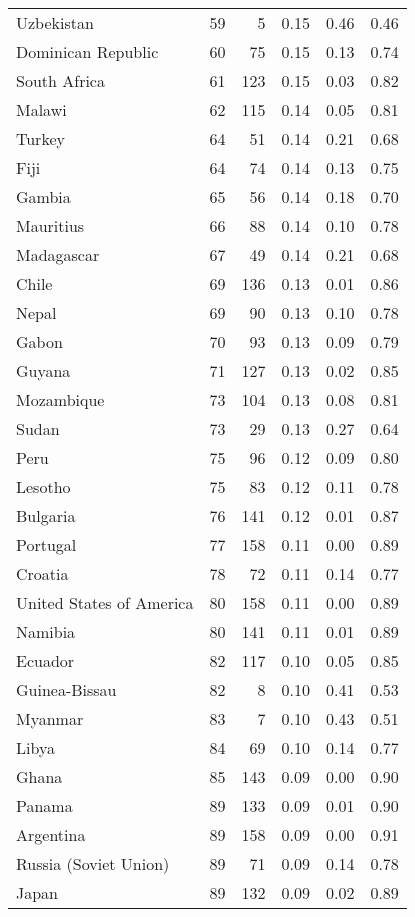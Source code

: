 \begin{longtable}[t]{lrrrrr}
Uzbekistan & 59 & 5 & 0.15 & 0.46 & 0.46\\
Dominican Republic & 60 & 75 & 0.15 & 0.13 & 0.74\\
\addlinespace
South Africa & 61 & 123 & 0.15 & 0.03 & 0.82\\
Malawi & 62 & 115 & 0.14 & 0.05 & 0.81\\
Turkey & 64 & 51 & 0.14 & 0.21 & 0.68\\
Fiji & 64 & 74 & 0.14 & 0.13 & 0.75\\
Gambia & 65 & 56 & 0.14 & 0.18 & 0.70\\
\addlinespace
Mauritius & 66 & 88 & 0.14 & 0.10 & 0.78\\
Madagascar & 67 & 49 & 0.14 & 0.21 & 0.68\\
Chile & 69 & 136 & 0.13 & 0.01 & 0.86\\
Nepal & 69 & 90 & 0.13 & 0.10 & 0.78\\
Gabon & 70 & 93 & 0.13 & 0.09 & 0.79\\
\addlinespace
Guyana & 71 & 127 & 0.13 & 0.02 & 0.85\\
Mozambique & 73 & 104 & 0.13 & 0.08 & 0.81\\
Sudan & 73 & 29 & 0.13 & 0.27 & 0.64\\
Peru & 75 & 96 & 0.12 & 0.09 & 0.80\\
Lesotho & 75 & 83 & 0.12 & 0.11 & 0.78\\
\addlinespace
Bulgaria & 76 & 141 & 0.12 & 0.01 & 0.87\\
Portugal & 77 & 158 & 0.11 & 0.00 & 0.89\\
Croatia & 78 & 72 & 0.11 & 0.14 & 0.77\\
United States of America & 80 & 158 & 0.11 & 0.00 & 0.89\\
Namibia & 80 & 141 & 0.11 & 0.01 & 0.89\\
\addlinespace
Ecuador & 82 & 117 & 0.10 & 0.05 & 0.85\\
Guinea-Bissau & 82 & 8 & 0.10 & 0.41 & 0.53\\
Myanmar & 83 & 7 & 0.10 & 0.43 & 0.51\\
Libya & 84 & 69 & 0.10 & 0.14 & 0.77\\
Ghana & 85 & 143 & 0.09 & 0.00 & 0.90\\
\addlinespace
Panama & 89 & 133 & 0.09 & 0.01 & 0.90\\
Argentina & 89 & 158 & 0.09 & 0.00 & 0.91\\
Russia (Soviet Union) & 89 & 71 & 0.09 & 0.14 & 0.78\\
Japan & 89 & 132 & 0.09 & 0.02 & 0.89\\

\end{longtable}
